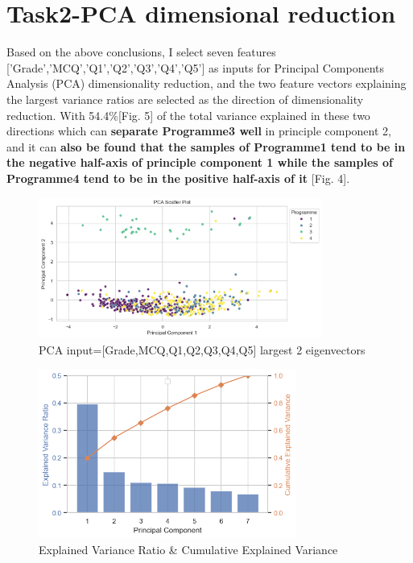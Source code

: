 \documentclass[journal]{IEEEtai}
\begin{document}
\section{\textbf{Task2-PCA dimensional reduction}}
Based on the above conclusions, I select seven features ['Grade','MCQ','Q1','Q2','Q3','Q4','Q5'] as inputs for Principal Components Analysis (PCA) dimensionality reduction, and the two feature vectors explaining the largest variance ratios are selected as the direction of dimensionality reduction. With 54.4\%[Fig. 5] of the total variance explained in these two directions which can \textbf{separate Programme3 well} in principle component 2, and it can \textbf{also be found that the samples of Programme1 tend to be in the negative half-axis of principle component 1 while the samples of Programme4 tend to be in the positive half-axis of it} [Fig. 4].

\begin{figure}[htbp]
	\centerline{\includegraphics[width=22pc]{pca_7_features_in.png}}
	\caption{PCA input=[Grade,MCQ,Q1,Q2,Q3,Q4,Q5] largest 2 eigenvectors}
\end{figure}

\begin{figure}[htbp]
	\centerline{\includegraphics[width=20pc]{pca_7_features_acc_in_6-4.png}}
	\caption{Explained Variance Ratio \& Cumulative Explained Variance}
\end{figure}
\end{document}
